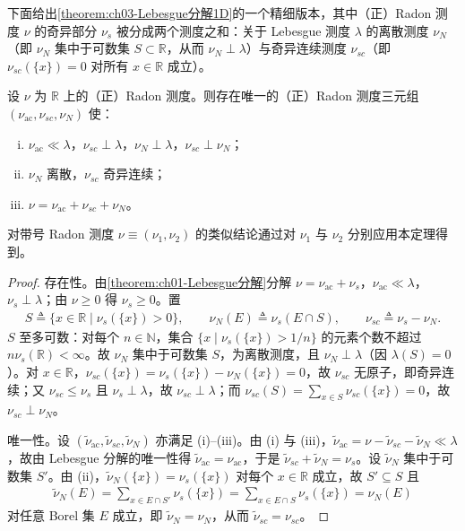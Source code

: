 \documentclass[../../main.tex]{subfiles}%
\begin{document}
下面给出\cref{theorem:ch03-Lebesgue分解1D}的一个精细版本，其中（正）Radon 测度 $\nu$ 的奇异部分 $\nu_s$ 被分成两个测度之和：关于 Lebesgue 测度 $\lambda$ 的离散测度 $\nu_N$（即 $\nu_N$ 集中于可数集 $S\subset\mathbb{R}$，从而 $\nu_N\perp\lambda$）与奇异连续测度 $\nu_{sc}$（即 $\nu_{sc}(\{x\})=0$ 对所有 $x\in\mathbb{R}$ 成立）。

\begin{theorem}\label{theorem:ch03-三分分解}
设 $\nu$ 为 $\mathbb{R}$ 上的（正）Radon 测度。则存在唯一的（正）Radon 测度三元组 $(\nu_{\mathrm{ac}},\nu_{sc},\nu_N)$ 使：
\begin{enumerate}[(i)]
\item $\nu_{\mathrm{ac}}\ll\lambda$，$\nu_{sc}\perp\lambda$，$\nu_N\perp\lambda$，$\nu_{sc}\perp\nu_N$；
\item $\nu_N$ 离散，$\nu_{sc}$ 奇异连续；
\item $\nu=\nu_{\mathrm{ac}}+\nu_{sc}+\nu_N$。
\end{enumerate}
对带号 Radon 测度 $\nu\equiv(\nu_1,\nu_2)$ 的类似结论通过对 $\nu_1$ 与 $\nu_2$ 分别应用本定理得到。
\end{theorem}

\begin{proof}
存在性。由\cref{theorem:ch01-Lebesgue分解}分解 $\nu=\nu_{\mathrm{ac}}+\nu_s$，$\nu_{\mathrm{ac}}\ll\lambda$，$\nu_s\perp\lambda$；由 $\nu\geqslant0$ 得 $\nu_s\geqslant0$。置
\begin{align*}
S\triangleq\{x\in\mathbb{R}\mid\nu_s(\{x\})>0\},\qquad \nu_N(E)\triangleq\nu_s(E\cap S),\qquad \nu_{sc}\triangleq\nu_s-\nu_N.
\end{align*}
$S$ 至多可数：对每个 $n\in\mathbb{N}$，集合 $\{x\mid\nu_s(\{x\})>1/n\}$ 的元素个数不超过 $n\nu_s(\mathbb{R})<\infty$。故 $\nu_N$ 集中于可数集 $S$，为离散测度，且 $\nu_N\perp\lambda$（因 $\lambda(S)=0$）。对 $x\in\mathbb{R}$，$\nu_{sc}(\{x\})=\nu_s(\{x\})-\nu_N(\{x\})=0$，故 $\nu_{sc}$ 无原子，即奇异连续；又 $\nu_{sc}\leqslant\nu_s$ 且 $\nu_s\perp\lambda$，故 $\nu_{sc}\perp\lambda$；而 $\nu_{sc}(S)=\sum_{x\in S}\nu_{sc}(\{x\})=0$，故 $\nu_{sc}\perp\nu_N$。

唯一性。设 $(\tilde\nu_{\mathrm{ac}},\tilde\nu_{sc},\tilde\nu_N)$ 亦满足 (i)--(iii)。由 (i) 与 (iii)，$\tilde\nu_{\mathrm{ac}}=\nu-\tilde\nu_{sc}-\tilde\nu_N\ll\lambda$，故由 Lebesgue 分解的唯一性得 $\tilde\nu_{\mathrm{ac}}=\nu_{\mathrm{ac}}$，于是 $\tilde\nu_{sc}+\tilde\nu_N=\nu_s$。设 $\tilde\nu_N$ 集中于可数集 $S'$。由 (ii)，$\tilde\nu_N(\{x\})=\nu_s(\{x\})$ 对每个 $x\in\mathbb{R}$ 成立，故 $S'\subseteq S$ 且
\begin{align*}
\tilde\nu_N(E)=\sum_{x\in E\cap S'}\nu_s(\{x\})=\sum_{x\in E\cap S}\nu_s(\{x\})=\nu_N(E)
\end{align*}
对任意 Borel 集 $E$ 成立，即 $\tilde\nu_N=\nu_N$，从而 $\tilde\nu_{sc}=\nu_{sc}$。
\end{proof}
\end{document}
